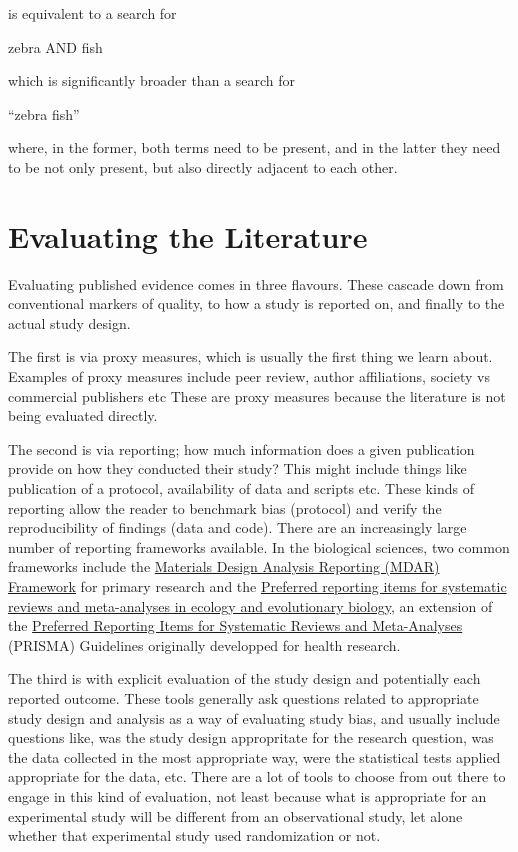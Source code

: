 \documentclass[
]{book}
\begin{document}
is equivalent to a search for

zebra AND fish

which is significantly broader than a search for

``zebra fish''

where, in the former, both terms need to be present, and in the latter they need to be not only present, but also directly adjacent to each other.

\hypertarget{evaluating-the-literature}{%
\section{Evaluating the Literature}\label{evaluating-the-literature}}

Evaluating published evidence comes in three flavours. These cascade down from conventional markers of quality, to how a study is reported on, and finally to the actual study design.

The first is via proxy measures, which is usually the first thing we learn about. Examples of proxy measures include peer review, author affiliations, society vs commercial publishers etc These are proxy measures because the literature is not being evaluated directly.

The second is via reporting; how much information does a given publication provide on how they conducted their study? This might include things like publication of a protocol, availability of data and scripts etc. These kinds of reporting allow the reader to benchmark bias (protocol) and verify the reproducibility of findings (data and code). There are an increasingly large number of reporting frameworks available. In the biological sciences, two common frameworks include the \href{https://doi.org/10.1073/pnas.2103238118}{Materials Design Analysis Reporting (MDAR) Framework} for primary research and the \href{https://doi.org/10.1111/brv.12721}{Preferred reporting items for systematic reviews and meta-analyses in ecology and evolutionary biology}, an extension of the \href{https://www.prisma-statement.org/}{Preferred Reporting Items for Systematic Reviews and Meta-Analyses} (PRISMA) Guidelines originally developped for health research.

The third is with explicit evaluation of the study design and potentially each reported outcome. These tools generally ask questions related to appropriate study design and analysis as a way of evaluating study bias, and usually include questions like, was the study design appropritate for the research question, was the data collected in the most appropriate way, were the statistical tests applied appropriate for the data, etc. There are a lot of tools to choose from out there to engage in this kind of evaluation, not least because what is appropriate for an experimental study will be different from an observational study, let alone whether that experimental study used randomization or not.
\end{document}
